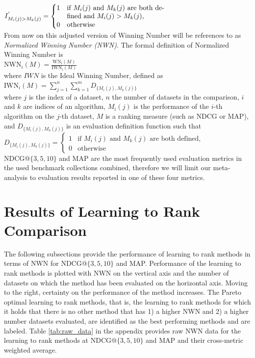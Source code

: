\documentclass[english, authoryear, preprint]{elsarticle}
\begin{document}
$I^{'}_{M_i(j)>M_k(j)} = \begin{cases}
1 & \parbox[t]{5cm}{if $M_i(j)$ and $M_k(j)$ are both defined and $M_i(j) > M_k(j)$,}\\
0 & \parbox[t]{5cm}{otherwise}
\end{cases}$\\

From now on this adjusted version of Winning Number will be references to as \emph{Normalized Winning Number (NWN)}. The formal definition of Normalized Winning Number is\\

$\text{NWN}_i(M) = \frac{\text{WN}_i(M)}{\text{IWN}_i(M)}$\\

\noindent
where $IWN$ is the Ideal Winning Number, defined as\\

$\text{IWN}_i(M) = \sum\nolimits_{j=1}^n \sum\nolimits_{k=1}^m D_{\{M_i(j),M_k(j)\}}$\\

where $j$ is the index of a dataset, $n$ the number of datasets in the comparison, $i$ and $k$ are indices of an algorithm, $M_i(j)$ is the performance of the $i$-th algorithm on the $j$-th dataset, $M$ is a ranking measure (such as NDCG or MAP), and $D_{\{M_i(j),M_k(j)\}}$ is an evaluation definition function such that\\

$D_{\{M_i(j),M_k(j)\}} = \begin{cases}
1 & \text{if } M_i(j) \text{ and } M_k(j) \text{ are both defined}, \\
0 & \text{otherwise}
\end{cases}$\\

NDCG@$\{3,5,10\}$ and MAP are the most frequently used evaluation metrics in the used benchmark collections combined, therefore we will limit our meta-analysis to evaluation results reported in one of these four metrics.

\section{Results of Learning to Rank Comparison}
The following subsections provide the performance of learning to rank methods in terms of NWN for NDCG@$\{3,5,10\}$ and MAP. Performance of the learning to rank methods is plotted with NWN on the vertical axis and the number of datasets on which the method has been evaluated on the horizontal axis. Moving to the right, certainty on the performance of the method increases. The Pareto optimal learning to rank methods, that is, the learning to rank methods for which it holds that there is no other method that has 1) a higher NWN and 2) a higher number datasets evaluated, are identified as the best performing methods and are labeled. Table \ref{tab:raw_data} in the appendix provides raw NWN data for the learning to rank methods at NDCG@$\{3,5,10\}$ and MAP and their cross-metric weighted average.
\end{document}
